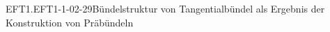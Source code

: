 \begin{EXA}{EFT1.EFT1-1-02-29}{Bündelstruktur von Tangentialbündel als Ergebnis der Konstruktion von Präbündeln}

\end{EXA}

